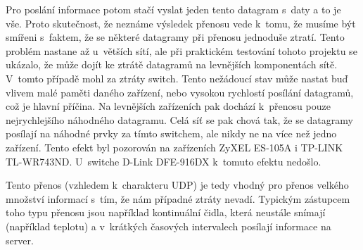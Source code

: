 Pro poslání informace potom stačí vyslat jeden tento datagram s~daty a to je vše. Proto skutečnost, že neznáme výsledek přenosu vede k~tomu, že musíme být smířeni s~faktem, že se některé datagramy při přenosu jednoduše ztratí. Tento problém nastane až u~větších sítí, ale při praktickém testování tohoto projektu se ukázalo, že může dojít ke ztrátě datagramů na levnějších komponentách sítě. V~tomto případě mohl za ztráty switch. Tento nežádoucí stav může nastat buď vlivem malé paměti daného zařízení, nebo vysokou rychlostí posílání datagramů, což je hlavní příčina. Na levnějších zařízeních pak dochází k~přenosu pouze nejrychlejšího náhodného datagramu. Celá síť se pak chová tak, že se datagramy posílají na náhodné prvky za tímto switchem, ale nikdy ne na více než jedno zařízení. Tento efekt byl pozorován na zařízeních ZyXEL ES-105A i TP-LINK TL-WR743ND. U~switche D-Link DFE-916DX k~tomuto efektu nedošlo.

Tento přenos (vzhledem k~charakteru UDP) je tedy vhodný pro přenos velkého množství informací s~tím, že nám případné ztráty nevadí. Typickým zástupcem toho typu přenosu jsou například kontinuální čidla, která neustále snímají (například teplotu) a v~krátkých časových intervalech posílají informace na server.